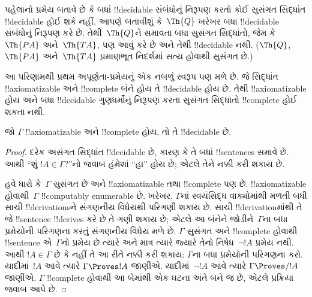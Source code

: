 \documentclass[../../../include/open-logic-section]{subfiles}
\begin{document}
\begin{explain}
પહેલાનો પ્રમેય બતાવે છે કે બધાં
!!{decidable} સંબંધોનું નિરૂપણ
કરતો કોઈ સુસંગત સિદ્ધાંત !!{decidable}
હોઈ શકે નહીં. આપણે બતાવીશું કે~$\Th{Q}$
ખરેખર બધા !!{decidable} સંબંધોનું
નિરૂપણ કરે છે. તેથી~$\Th{Q}$ને
સમાવતા બધા સુસંગત સિદ્ધાંતો, જેમ કે~$\Th{PA}$
અને~$\Th{TA}$, પણ આવું કરે છે અને તેથી
!!{decidable} નથી. ($\Th{Q}$, $\Th{PA}$ અને~$\Th{TA}$
પ્રમાણભૂત નિદર્શમાં સત્ય હોવાથી સુસંગત છે.)

આ પરિણામથી પ્રથમ અપૂર્ણતા-પ્રમેયનું એક
નબળું સ્વરૂપ પણ મળે છે. જે સિદ્ધાંત
!!{axiomatizable} અને !!{complete} બંને
હોય તે !!{decidable} હોય છે. તેથી
!!{axiomatizable} હોય અને બધા
!!{decidable} ગુણધર્મોનું નિરૂપણ
કરતા સુસંગત સિદ્ધાંતો !!{complete}
હોઈ શકતા નથી.
\end{explain}

\begin{thm}
જો $\Gamma$ !!{axiomatizable} અને
!!{complete} હોય, તો તે !!{decidable} છે.
\end{thm}

\begin{proof}
દરેક અસંગત સિદ્ધાંત !!{decidable} છે,
કારણ કે તે બધાં !!{sentence}s સમાવે છે.
આથી ``શું $!A \in \Gamma$?''નો જવાબ
હંમેશાં ``હા'' હોય છે; એટલે તેને નક્કી
કરી શકાય છે.

હવે ધારો કે~$\Gamma$ સુસંગત છે અને
!!{axiomatizable} તથા !!{complete} પણ છે.
!!{axiomatizable} હોવાથી~$\Gamma$
!!{computably enumerable} છે. ખરેખર,
$\Gamma$નાં સ્વયંસિદ્ધ વાક્યોમાંથી મળતી
બધી સાચી !!{derivation}sને સંગણનીય
વિધેયથી પરિગણી શકાય છે. સાચી
!!{derivation}માંથી તે જે !!{sentence}
!!{derive}s કરે છે તે ગણી શકાય છે;
એટલે આ બંનેને જોડીને~$\Gamma$ના બધા
પ્રમેયોની પરિગણના કરતું સંગણનીય વિધેય
મળે છે. $\Gamma$ સુસંગત અને !!{complete}
હોવાથી !!{sentence} એ~$\Gamma$નો પ્રમેય છે ત્યારે અને
માત્ર ત્યારે જ્યારે તેનો નિષેધ~$\lnot !A$ પ્રમેય નથી.
આથી $!A \in \Gamma$ છે કે નહીં તે
આ રીતે નક્કી કરી શકાય: $\Gamma$ના
બધા પ્રમેયોની પરિગણના કરો. યાદીમાં~$!A$
આવે ત્યારે $\Gamma \Proves !A$ જાણીએ.
યાદીમાં~$\lnot !A$ આવે ત્યારે
$\Gamma \Proves/ !A$ જાણીએ. $\Gamma$
!!{complete} હોવાથી આ બેમાંથી એક ઘટના
અંતે બને જ છે, એટલે પ્રક્રિયા જવાબ આપે છે.
\end{proof}
\end{document}
